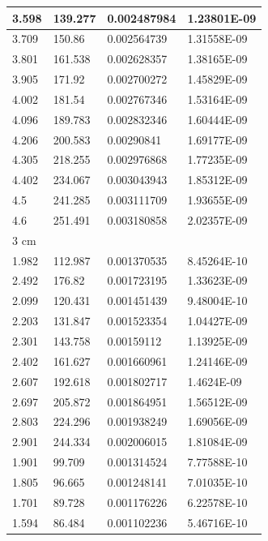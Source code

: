 \documentclass{article}
\begin{document}
\begin{longtable}{|l|l|l|l|}
        3.598 & 139.277 & 0.002487984 & 1.23801E-09 \\ \hline
        3.709 & 150.86 & 0.002564739 & 1.31558E-09 \\ \hline
        3.801 & 161.538 & 0.002628357 & 1.38165E-09 \\ \hline
        3.905 & 171.92 & 0.002700272 & 1.45829E-09 \\ \hline
        4.002 & 181.54 & 0.002767346 & 1.53164E-09 \\ \hline
        4.096 & 189.783 & 0.002832346 & 1.60444E-09 \\ \hline
        4.206 & 200.583 & 0.00290841 & 1.69177E-09 \\ \hline
        4.305 & 218.255 & 0.002976868 & 1.77235E-09 \\ \hline
        4.402 & 234.067 & 0.003043943 & 1.85312E-09 \\ \hline
        4.5 & 241.285 & 0.003111709 & 1.93655E-09 \\ \hline
        4.6 & 251.491 & 0.003180858 & 2.02357E-09 \\ \hline
        3 cm & ~ & ~ & ~ \\ \hline
        1.982 & 112.987 & 0.001370535 & 8.45264E-10 \\ \hline
        2.492 & 176.82 & 0.001723195 & 1.33623E-09 \\ \hline
        2.099 & 120.431 & 0.001451439 & 9.48004E-10 \\ \hline
        2.203 & 131.847 & 0.001523354 & 1.04427E-09 \\ \hline
        2.301 & 143.758 & 0.00159112 & 1.13925E-09 \\ \hline
        2.402 & 161.627 & 0.001660961 & 1.24146E-09 \\ \hline
        2.607 & 192.618 & 0.001802717 & 1.4624E-09 \\ \hline
        2.697 & 205.872 & 0.001864951 & 1.56512E-09 \\ \hline
        2.803 & 224.296 & 0.001938249 & 1.69056E-09 \\ \hline
        2.901 & 244.334 & 0.002006015 & 1.81084E-09 \\ \hline
        1.901 & 99.709 & 0.001314524 & 7.77588E-10 \\ \hline
        1.805 & 96.665 & 0.001248141 & 7.01035E-10 \\ \hline
        1.701 & 89.728 & 0.001176226 & 6.22578E-10 \\ \hline
        1.594 & 86.484 & 0.001102236 & 5.46716E-10 \\ \hline

\end{longtable}
\end{document}
